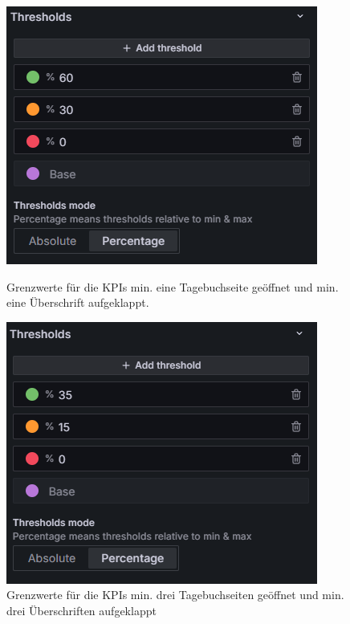 \begin{figure}[H]
    \centering
    \begin{minipage}{0.49\textwidth}
        \centering
        \includegraphics[width=\linewidth, keepaspectratio]{images/thresholds-min-eins.png}
        \caption{Grenzwerte für die KPIs \glqq min. eine Tagebuchseite geöffnet\grqq{} und \glqq min. eine Überschrift aufgeklappt\grqq{}.}
        \label{fig:thresholds-min-eins}
    \end{minipage}
    \hfill
    \begin{minipage}{0.49\textwidth}
        \centering
        \includegraphics[width=\linewidth, keepaspectratio]{images/thresholds-min-drei.png}
        \caption{Grenzwerte für die KPIs \glqq min. drei Tagebuchseiten geöffnet\grqq{} und \glqq min. drei Überschriften aufgeklappt\grqq{} }
        \label{fig:thresholds-min-drei}
    \end{minipage}
\end{figure}

